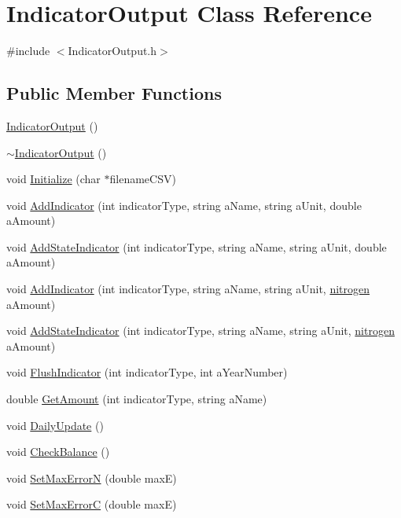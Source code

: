 \hypertarget{class_indicator_output}{
\section{IndicatorOutput Class Reference}
\label{class_indicator_output}
}


{\ttfamily \#include $<$IndicatorOutput.h$>$}\subsection*{Public Member Functions}
\begin{DoxyCompactItemize}
\item 
\hyperlink{class_indicator_output_a16d7c595d15f04e8234858ff6cb2b82d}{IndicatorOutput} ()
\item 
\hyperlink{class_indicator_output_a48fb1af294aefcf7bbcdc4e9f1b04c57}{$\sim$IndicatorOutput} ()
\item 
void \hyperlink{class_indicator_output_a580f364c5b0f365955f47a44fac302e3}{Initialize} (char $\ast$filenameCSV)
\item 
void \hyperlink{class_indicator_output_a50aa53ae58d243f6eef65a360e1196c8}{AddIndicator} (int indicatorType, string aName, string aUnit, double aAmount)
\item 
void \hyperlink{class_indicator_output_a1a631aa0f783160f5c12f0ad12e67c37}{AddStateIndicator} (int indicatorType, string aName, string aUnit, double aAmount)
\item 
void \hyperlink{class_indicator_output_a2b07637be2883b515b05d538a7b444de}{AddIndicator} (int indicatorType, string aName, string aUnit, \hyperlink{classnitrogen}{nitrogen} aAmount)
\item 
void \hyperlink{class_indicator_output_ab31b639c00e3801c90b4faef370602e1}{AddStateIndicator} (int indicatorType, string aName, string aUnit, \hyperlink{classnitrogen}{nitrogen} aAmount)
\item 
void \hyperlink{class_indicator_output_abd79068b0443ed1c4eb43c5f88664111}{FlushIndicator} (int indicatorType, int aYearNumber)
\item 
double \hyperlink{class_indicator_output_a129e8b80f7102730a2103b879c486168}{GetAmount} (int indicatorType, string aName)
\item 
void \hyperlink{class_indicator_output_a15264189fefc34768726420283bd1ebc}{DailyUpdate} ()
\item 
void \hyperlink{class_indicator_output_a457faed0a5693358f7c0eb9db2d8dc4b}{CheckBalance} ()
\item 
void \hyperlink{class_indicator_output_aa849c5243c889dd83b0f07e8bc72b4da}{SetMaxErrorN} (double maxE)
\item 
void \hyperlink{class_indicator_output_a1269716d2ca0c1a260e033dfda4a1b7e}{SetMaxErrorC} (double maxE)
\end{DoxyCompactItemize}
